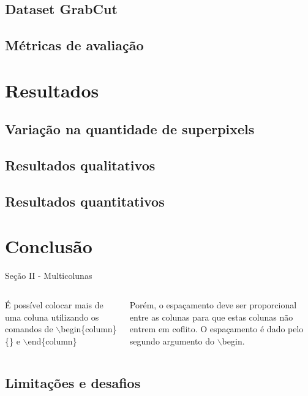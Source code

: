 \documentclass{templatebeamerufc/libs/ufc_format}
\begin{document}
\subsection{Dataset GrabCut}

\subsection{Métricas de avaliação}


\section{Resultados}

\subsection{Variação na quantidade de superpixels}
\subsection{Resultados qualitativos}
\subsection{Resultados quantitativos}

\section{Conclusão}
\begin{frame}{Seção II - Multicolunas}
    \begin{columns}{}
        \begin{column}{0.5\textwidth}
            \justify
            É possível colocar mais de uma coluna utilizando os comandos de $\backslash$begin\{column\}\{\} e $\backslash$end\{column\}
        \end{column}
        \begin{column}{0.5\textwidth}
            \justify
            Porém, o espaçamento deve ser proporcional entre as colunas para que estas colunas não entrem em coflito. O espaçamento é dado pelo segundo argumento do $\backslash$begin.
        \end{column}
    \end{columns}
\end{frame}

\subsection{Limitações e desafios}
\end{document}
